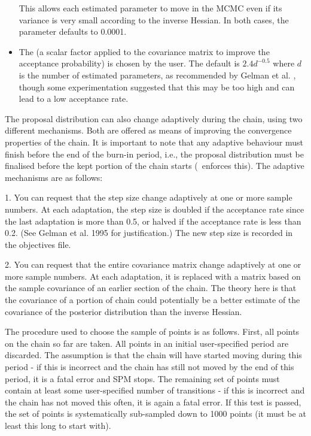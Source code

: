 \begin{itemize}
This allows each estimated parameter to move in the MCMC even if its variance is very small according to the inverse Hessian. In both cases, the  parameter defaults to 0.0001.

\item The  (a scalar factor applied to the covariance matrix to improve the acceptance probability) is chosen by the user. The default is $2.4d^{-0.5}$ where $d$ is the number of estimated parameters, as recommended by Gelman et al. \citep{823}, though some experimentation suggested that this may be too high and can lead to a low acceptance rate. 
\end{itemize}

The proposal distribution can also change adaptively during the chain, using two different mechanisms. Both are offered as means of improving the convergence properties of the chain. It is important to note that any adaptive behaviour must finish before the end of the burn-in period, i.e., the proposal distribution must be finalised before the kept portion of the chain starts (\SPM\ enforces this). The adaptive mechanisms are as follows: 

1.	You can request that the step size change adaptively at one or more sample numbers. At each adaptation, the step size is doubled if the acceptance rate since the last adaptation is more than 0.5, or halved if the acceptance rate is less than 0.2. (See Gelman et al. 1995 for justification.) The new step size is recorded in the objectives file. 

2.	You can request that the entire covariance matrix change adaptively at one or more sample numbers. At each adaptation, it is replaced with a matrix based on the sample covariance of an earlier section of the chain. The theory here is that the covariance of a portion of chain could potentially be a better estimate of the covariance of the posterior distribution than the inverse Hessian.

	The procedure used to choose the sample of points is as follows. First, all points on the chain so far are taken. All points in an initial user-specified period are discarded. The assumption is that the chain will have started moving during this period - if this is incorrect and the chain has still not moved by the end of this period, it is a fatal error and SPM stops. The remaining set of points must contain at least some user-specified number of transitions - if this is incorrect and the chain has not moved this often, it is again a fatal error. If this test is passed, the set of points is systematically sub-sampled down to 1000 points (it must be at least this long to start with).

